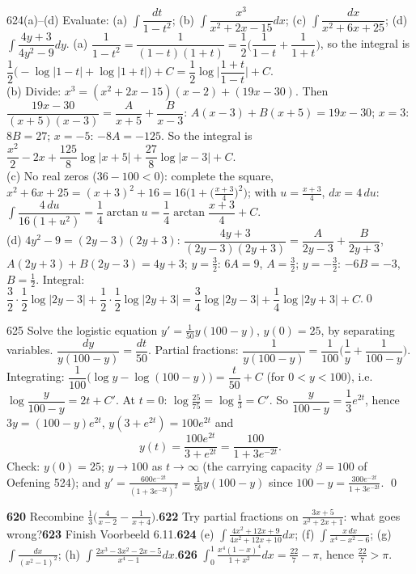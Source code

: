 \begin{bookex}{624(a)--(d)}
Evaluate: (a) $\int\dfrac{dt}{1-t^2}$; (b) $\int\dfrac{x^3}{x^2+2x-15}dx$; (c) $\int\dfrac{dx}{x^2+6x+25}$; (d) $\int\dfrac{4y+3}{4y^2-9}dy$.
\solution
(a) $\dfrac1{1-t^2}=\dfrac1{(1-t)(1+t)}=\dfrac12\Big(\dfrac1{1-t}+\dfrac1{1+t}\Big)$, so the integral is $\dfrac12\big(-\log|1-t|+\log|1+t|\big)+C=\dfrac12\log\Big|\dfrac{1+t}{1-t}\Big|+C$.\\
(b) Divide: $x^3=(x^2+2x-15)(x-2)+(19x-30)$. Then $\dfrac{19x-30}{(x+5)(x-3)}=\dfrac A{x+5}+\dfrac B{x-3}$: $A(x-3)+B(x+5)=19x-30$; $x=3$: $8B=27$; $x=-5$: $-8A=-125$. So the integral is $\dfrac{x^2}2-2x+\dfrac{125}8\log|x+5|+\dfrac{27}8\log|x-3|+C$.\\
(c) No real zeros ($36-100<0$): complete the square, $x^2+6x+25=(x+3)^2+16=16\Big(1+\big(\tfrac{x+3}4\big)^2\Big)$; with $u=\frac{x+3}4$, $dx=4\,du$: $\int\dfrac{4\,du}{16(1+u^2)}=\dfrac14\arctan u=\dfrac14\arctan\dfrac{x+3}4+C$.\\
(d) $4y^2-9=(2y-3)(2y+3)$: $\dfrac{4y+3}{(2y-3)(2y+3)}=\dfrac A{2y-3}+\dfrac B{2y+3}$, $A(2y+3)+B(2y-3)=4y+3$; $y=\frac32$: $6A=9$, $A=\frac32$; $y=-\frac32$: $-6B=-3$, $B=\frac12$. Integral: $\dfrac32\cdot\dfrac12\log|2y-3|+\dfrac12\cdot\dfrac12\log|2y+3|=\dfrac34\log|2y-3|+\dfrac14\log|2y+3|+C$.\qed
\end{bookex}

\begin{bookex}{625}
Solve the logistic equation $y'=\frac1{50}y(100-y)$, $y(0)=25$, by separating variables.
\solution
$\dfrac{dy}{y(100-y)}=\dfrac{dt}{50}$. Partial fractions: $\dfrac1{y(100-y)}=\dfrac1{100}\Big(\dfrac1y+\dfrac1{100-y}\Big)$. Integrating: $\dfrac1{100}\big(\log y-\log(100-y)\big)=\dfrac t{50}+C$ (for $0<y<100$), i.e.\ $\log\dfrac y{100-y}=2t+C'$. At $t=0$: $\log\frac{25}{75}=\log\frac13=C'$. So $\dfrac y{100-y}=\dfrac13e^{2t}$, hence $3y=(100-y)e^{2t}$, $y(3+e^{2t})=100e^{2t}$ and
\[
y(t)=\frac{100e^{2t}}{3+e^{2t}}=\frac{100}{1+3e^{-2t}} .
\]
Check: $y(0)=25$; $y\to100$ as $t\to\infty$ (the carrying capacity $\beta=100$ of Oefening 524); and $y'=\frac{600e^{-2t}}{(1+3e^{-2t})^2}=\frac1{50}y(100-y)$ since $100-y=\frac{300e^{-2t}}{1+3e^{-2t}}$. \checkmark\qed
\end{bookex}

\begin{trybox}[{620, 622, 623, 624(e)--(h), 626}]
\textbf{620} Recombine $\frac13\big(\frac4{x-2}-\frac1{x+4}\big)$.\quad \textbf{622} Try partial fractions on $\frac{3x+5}{x^2+2x+1}$: what goes wrong?\quad \textbf{623} Finish Voorbeeld 6.11.\quad \textbf{624} (e) $\int\frac{4x^2+12x+9}{4x^2+12x+10}dx$; (f) $\int\frac{x\,dx}{x^4-x^2-6}$; (g) $\int\frac{dx}{(x^2-1)^2}$; (h) $\int\frac{2x^3-3x^2-2x-5}{x^4-1}dx$.\quad \textbf{626} $\int_0^1\frac{x^4(1-x)^4}{1+x^2}dx=\frac{22}7-\pi$, hence $\frac{22}7>\pi$.
\end{trybox}

